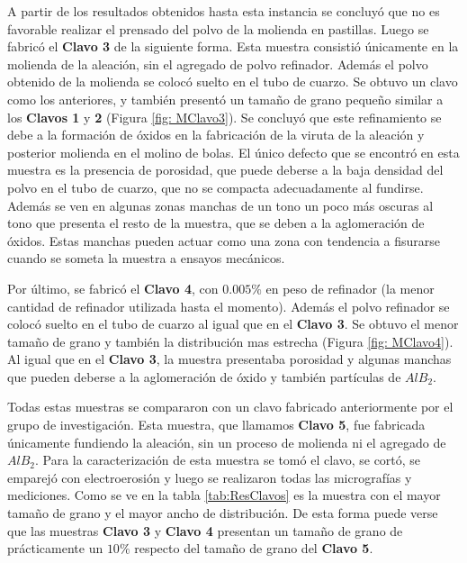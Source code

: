 \documentclass[a4paper,12pt,fleqn,twoside,openany]{book}
\begin{document}
A partir de los resultados obtenidos hasta esta instancia se concluyó que no es favorable realizar el prensado del polvo de la molienda en pastillas. 
Luego se fabricó el \textbf{Clavo 3} de la siguiente forma. Esta muestra consistió únicamente en la molienda de la aleación, sin el agregado de polvo refinador. Además el polvo obtenido de la molienda se colocó suelto en el tubo de cuarzo. Se obtuvo un clavo como los anteriores, y también presentó un tamaño de grano pequeño similar a los \textbf{Clavos 1} y \textbf{2} (Figura \ref{fig: MClavo3}). Se concluyó que este refinamiento se debe a la formación de óxidos en la fabricación de la viruta de la aleación y posterior molienda en el molino de bolas. El único defecto que se encontró en esta muestra es la presencia de porosidad, que puede deberse a la baja densidad del polvo en el tubo de cuarzo, que no se compacta adecuadamente al fundirse. Además se ven en algunas zonas manchas de un tono un poco más oscuras al tono que presenta el resto de la muestra, que se deben a la aglomeración de óxidos. Estas manchas pueden actuar como una zona con tendencia a fisurarse cuando se someta la muestra a ensayos mecánicos. 

Por último, se fabricó el  \textbf{Clavo 4}, con $0.005 \%$ en peso de refinador (la menor cantidad de refinador utilizada hasta el momento). Además el polvo refinador se colocó suelto en el tubo de cuarzo al igual que en el \textbf{Clavo 3}. Se obtuvo el menor tamaño de grano y también la distribución mas estrecha (Figura \ref{fig: MClavo4}). Al igual que en el \textbf{Clavo 3}, la muestra presentaba porosidad y algunas manchas que pueden deberse a la aglomeración de óxido y también partículas de $AlB_2$.
 


Todas estas muestras se compararon con un clavo fabricado anteriormente por el grupo de investigación. Esta muestra, que llamamos \textbf{Clavo 5}, fue fabricada únicamente fundiendo la aleación, sin un proceso de molienda ni el agregado de $AlB_2$. Para la caracterización de esta muestra se tomó el clavo, se cortó, se emparejó con electroerosión y luego se realizaron todas las micrografías y mediciones. Como se ve en la tabla \ref{tab:ResClavos} es la muestra con el mayor tamaño de grano y el mayor ancho de distribución. De esta forma puede verse que las muestras \textbf{Clavo 3} y \textbf{Clavo 4} presentan un tamaño de grano de prácticamente un $10 \%$ respecto del tamaño de grano del \textbf{Clavo 5}.   
\end{document}
